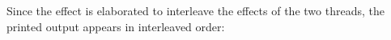 \begin{code}%
%
\>[8]\AgdaSpace{}%
\AgdaSymbol{:}\AgdaSpace{}%
\AgdaSpace{}%
\AgdaSymbol{(}\AgdaSpace{}%
\AgdaSpace{}%
\AgdaSpace{}%
\AgdaSpace{}%
\AgdaSpace{}%
\AgdaSpace{}%
\AgdaSymbol{)}\AgdaSpace{}%
\<%
\\
%
\>[8]\AgdaSpace{}%
\AgdaSymbol{=}\AgdaSpace{}%
%
\>[27]\AgdaSymbol{(}\AgdaSpace{}%
\AgdaSpace{}%
\AgdaSpace{}%
\AgdaSymbol{;}\AgdaSpace{}%
\AgdaSpace{}%
\AgdaSpace{}%
\AgdaSymbol{;}\AgdaSpace{}%
\AgdaSpace{}%
\AgdaSpace{}%
\AgdaSymbol{;}\AgdaSpace{}%
\AgdaSpace{}%
\AgdaSymbol{)}\<%
\\
%
\>[27]\AgdaSymbol{(}\AgdaSpace{}%
\AgdaSpace{}%
\AgdaSpace{}%
\AgdaSymbol{;}\AgdaSpace{}%
\AgdaSpace{}%
\AgdaSpace{}%
\AgdaSymbol{;}\AgdaSpace{}%
\AgdaSpace{}%
\AgdaSymbol{)}\<%
\end{code}
%
Since the  effect is elaborated to interleave the effects of the two threads, the printed output appears in interleaved order:
%
